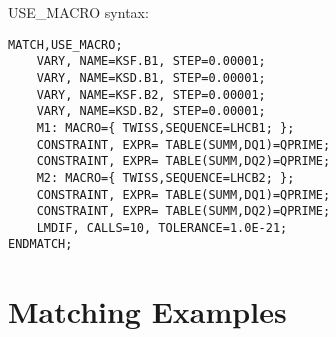 USE\_MACRO syntax:

\begin{verbatim}
MATCH,USE_MACRO;
    VARY, NAME=KSF.B1, STEP=0.00001;
    VARY, NAME=KSD.B1, STEP=0.00001;
    VARY, NAME=KSF.B2, STEP=0.00001;
    VARY, NAME=KSD.B2, STEP=0.00001;
    M1: MACRO={ TWISS,SEQUENCE=LHCB1; };
    CONSTRAINT, EXPR= TABLE(SUMM,DQ1)=QPRIME;
    CONSTRAINT, EXPR= TABLE(SUMM,DQ2)=QPRIME;
    M2: MACRO={ TWISS,SEQUENCE=LHCB2; };
    CONSTRAINT, EXPR= TABLE(SUMM,DQ1)=QPRIME;
    CONSTRAINT, EXPR= TABLE(SUMM,DQ2)=QPRIME;
    LMDIF, CALLS=10, TOLERANCE=1.0E-21;
ENDMATCH;
\end{verbatim}




%
 
\section{Matching Examples}
\label{sec:match_examples}

